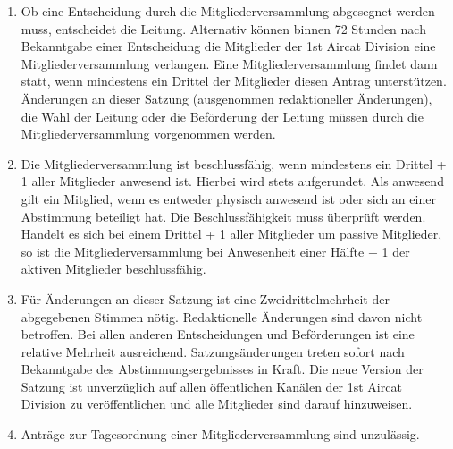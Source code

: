 \begin{enumerate}[label=(\arabic*)]
\begin{enumerate}[label=(\Alph*)]
    \end{enumerate}
    \item Ob eine Entscheidung durch die Mitgliederversammlung abgesegnet werden muss, entscheidet die Leitung. Alternativ können binnen 72 Stunden nach Bekanntgabe einer Entscheidung die Mitglieder der 1st Aircat Division eine Mitgliederversammlung verlangen. Eine Mitgliederversammlung findet dann statt, wenn mindestens ein Drittel der Mitglieder diesen Antrag unterstützen. Änderungen an dieser Satzung (ausgenommen redaktioneller Änderungen), die Wahl der Leitung oder die Beförderung der Leitung müssen durch die Mitgliederversammlung vorgenommen werden.
    \item Die Mitgliederversammlung ist beschlussfähig, wenn mindestens ein Drittel + 1 aller Mitglieder anwesend ist. Hierbei wird stets aufgerundet. Als anwesend gilt ein Mitglied, wenn es entweder physisch anwesend ist oder sich an einer Abstimmung beteiligt hat. Die Beschlussfähigkeit muss überprüft werden. Handelt es sich bei einem Drittel + 1 aller Mitglieder um passive Mitglieder, so ist die Mitgliederversammlung bei Anwesenheit einer Hälfte + 1 der aktiven Mitglieder beschlussfähig.
    \item\label{itm:satzungsaenderungen} Für Änderungen an dieser Satzung ist eine Zweidrittelmehrheit der abgegebenen Stimmen nötig. Redaktionelle Änderungen sind davon nicht betroffen. Bei allen anderen Entscheidungen und Beförderungen ist eine relative Mehrheit ausreichend. Satzungsänderungen treten sofort nach Bekanntgabe des Abstimmungsergebnisses in Kraft. Die neue Version der Satzung ist unverzüglich auf allen öffentlichen Kanälen der 1st Aircat Division zu veröffentlichen und alle Mitglieder sind darauf hinzuweisen.
    \item Anträge zur Tagesordnung einer Mitgliederversammlung sind unzulässig.
\end{enumerate}